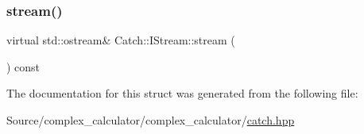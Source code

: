 \subsubsection{\texorpdfstring{stream()}{stream()}}
{\footnotesize\ttfamily virtual std\+::ostream\& Catch\+::\+I\+Stream\+::stream (\begin{DoxyParamCaption}{ }\end{DoxyParamCaption}) const\hspace{0.3cm}{\ttfamily [pure virtual]}}



The documentation for this struct was generated from the following file\+:\begin{DoxyCompactItemize}
\item 
Source/complex\+\_\+calculator/complex\+\_\+calculator/\mbox{\hyperlink{catch_8hpp}{catch.\+hpp}}\end{DoxyCompactItemize}
